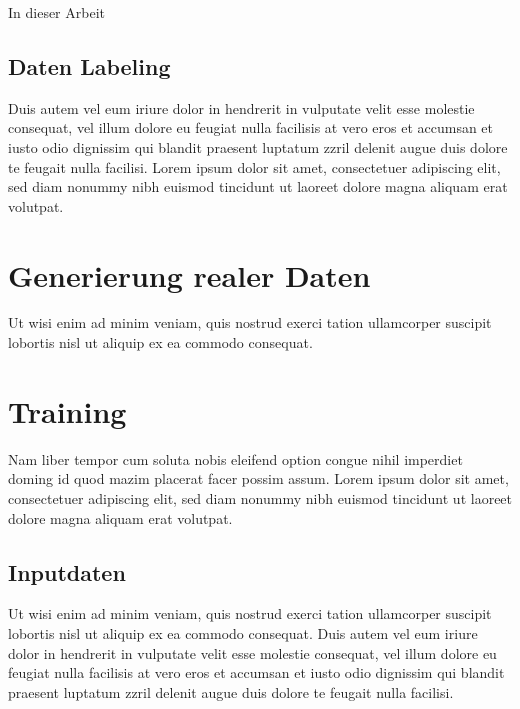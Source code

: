 In dieser Arbeit 


\subsection{Daten Labeling}
\label{umsetzung_daten_synth_labeling}

Duis autem vel eum iriure dolor in hendrerit in vulputate velit esse molestie consequat, vel illum dolore eu feugiat nulla facilisis at vero eros et accumsan et iusto odio dignissim qui blandit praesent luptatum zzril delenit augue duis dolore te feugait nulla facilisi. Lorem ipsum dolor sit amet, consectetuer adipiscing elit, sed diam nonummy nibh euismod tincidunt ut laoreet dolore magna aliquam erat volutpat.


\section{Generierung realer Daten}
\label{umsetzung_daten_real}

Ut wisi enim ad minim veniam, quis nostrud exerci tation ullamcorper suscipit lobortis nisl ut aliquip ex ea commodo consequat.


\section{Training}
\label{umsetzung_training}

Nam liber tempor cum soluta nobis eleifend option congue nihil imperdiet doming id quod mazim placerat facer possim assum. Lorem ipsum dolor sit amet, consectetuer adipiscing elit, sed diam nonummy nibh euismod tincidunt ut laoreet dolore magna aliquam erat volutpat.


\subsection{Inputdaten}
\label{umsetzung_training_input}

Ut wisi enim ad minim veniam, quis nostrud exerci tation ullamcorper suscipit lobortis nisl ut aliquip ex ea commodo consequat. Duis autem vel eum iriure dolor in hendrerit in vulputate velit esse molestie consequat, vel illum dolore eu feugiat nulla facilisis at vero eros et accumsan et iusto odio dignissim qui blandit praesent luptatum zzril delenit augue duis dolore te feugait nulla facilisi.


